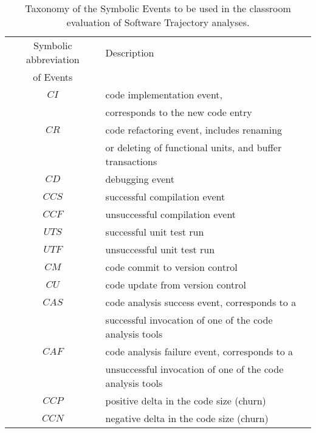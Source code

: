 \begin{table}
\begin{center}
    \begin{tabular}{ | c | l | }
    \hline
    Symbolic abbreviation & Description \\ 
     of Events 						& 	  \\ 
    \hline
    $CI$                  & code implementation event, \\
    											& corresponds to the new code entry \\
    \hline    											
    $CR$                  & code refactoring event, includes renaming \\
    											& or deleting of functional units, and buffer transactions \\
    \hline
    $CD$                  & debugging event \\
		\hline
		$CCS$                 & successful compilation event \\
		\hline
		$CCF$                 & unsuccessful compilation event \\
    \hline
		$UTS$                 & successful unit test run \\
		\hline
		$UTF$                 & unsuccessful unit test run \\
		\hline
		$CM$                  & code commit to version control \\
		\hline
		$CU$                  & code update from version control \\
		\hline
    $CAS$                 & code analysis success event, corresponds to a \\
                          & successful invocation of one of the code analysis tools \\
    \hline
		$CAF$                 & code analysis failure event, corresponds to a \\
                          & unsuccessful invocation of one of the code analysis tools \\
    \hline    
    $CCP$                 & positive delta in the code size (churn) \\
    \hline
    $CCN$                 & negative delta in the code size (churn) \\
    \hline
    \end{tabular}
    \caption{Taxonomy of the Symbolic Events to be used in the classroom evaluation of Software Trajectory analyses.}
    \label{fig:data_collected_points}
    \end{center}
\end{table}

